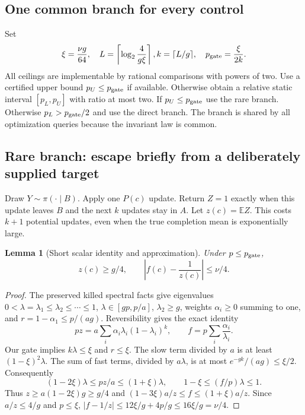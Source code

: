 \documentclass[11pt]{article}
\newtheorem{lemma}[theorem]{Lemma}
\newcommand{\E}{\mathbb E}
\begin{document}
\subsection{One common branch for every control}
Set
\begin{equation}
 \xi=\frac{\nu g}{64},\quad
 L=\left\lceil\log_2\frac4{g\xi}\right\rceil,
 k=\lceil L/g\rceil,\quad p_{\rm gate}=\frac{\xi}{2k}.
 \label{eq:oracleSchedule}
\end{equation}
All ceilings are implementable by rational comparisons with powers of
two. Use a certified upper bound $p_U\le p_{\rm gate}$ if available.
Otherwise obtain a relative static interval $[p_L,p_U]$ with ratio at
most two. If $p_U\le p_{\rm gate}$ use the rare branch. Otherwise
$p_L>p_{\rm gate}/2$ and use the direct branch. The branch is shared by
all optimization queries because the invariant law is common.

\subsection{Rare branch: escape briefly from a deliberately supplied target}
Draw $Y\sim\pi(\cdot\mid B)$. Apply one $P(c)$ update. Return $Z=1$
exactly when this update leaves $B$ and the next $k$ updates stay in $A$.
Let $z(c)=\E Z$. This costs $k+1$ potential updates, even when the true
completion mean is exponentially large.

\begin{lemma}[Short scalar identity and approximation]
Under $p\le p_{\rm gate}$,
\[
 z(c)\ge g/4,
 \qquad \left|f(c)-\frac1{z(c)}\right|\le\nu/4.
 \label{eq:zApprox}
\]
\end{lemma}
\begin{proof}
The preserved killed spectral facts give eigenvalues
$0<\lambda=\lambda_1\le\lambda_2\le\cdots\le1$,
$\lambda\in[gp,p/a]$, $\lambda_2\ge g$, weights
$\alpha_i\ge0$ summing to one, and
$r=1-\alpha_1\le p/(ag)$. Reversibility gives the exact identity
\[
 pz=a\sum_i\alpha_i\lambda_i(1-\lambda_i)^k,
 \qquad f=p\sum_i\frac{\alpha_i}{\lambda_i}.
\]
Our gate implies $k\lambda\le\xi$ and $r\le\xi$.
The slow term divided by $a$ is at least
$(1-\xi)^2\lambda$. The sum of fast terms, divided by $a\lambda$,
is at most $e^{-gk}/(ag)\le\xi/2$. Consequently
\[
 (1-2\xi)\lambda\le pz/a\le(1+\xi)\lambda,
 \qquad 1-\xi\le (f/p)\lambda\le1.
\]
Thus $z\ge a(1-2\xi)g\ge g/4$ and
$(1-3\xi)a/z\le f\le(1+\xi)a/z$.
Since $a/z\le4/g$ and $p\le\xi$,
$|f-1/z|\le12\xi/g+4p/g\le16\xi/g=\nu/4$.
\end{proof}
\end{document}
